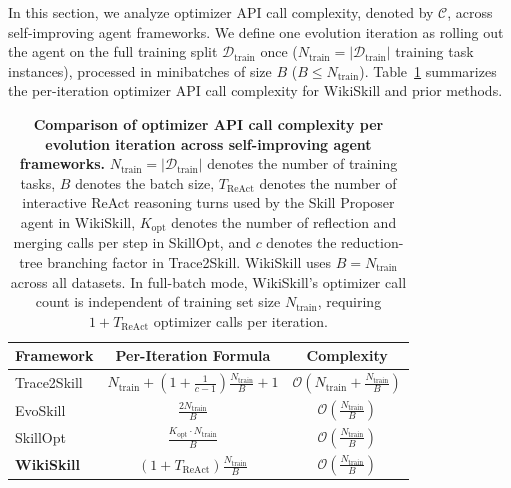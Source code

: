 \documentclass[11pt, a4paper, copyright, gr]{google}
\newcommand{\methodcolor}[1]{\cellcolor[HTML]{FDE293}#1}
\newcommand{\method}{WikiSkill\xspace}
\begin{document}
In this section, we analyze optimizer API call complexity, denoted by $\mathcal{C}$, across self-improving agent frameworks. We define one evolution iteration as rolling out the agent on the full training split $\mathcal{D}_{\text{train}}$ once ($N_{\text{train}} = |\mathcal{D}_{\text{train}}|$ training task instances), processed in minibatches of size $B$ ($B \le N_{\text{train}}$). Table~\ref{tab:api_complexity_summary} summarizes the per-iteration optimizer API call complexity for WikiSkill and prior methods.
\begin{table}[h]
\centering
\small
\begin{tabular}{l c c}
\toprule
\textbf{Framework} & \textbf{Per-Iteration Formula} & \textbf{Complexity} \\
\midrule
Trace2Skill & $N_{\text{train}} + \left(1 + \frac{1}{c-1}\right) \frac{N_{\text{train}}}{B} + 1$ & $\mathcal{O}\left(N_{\text{train}} + \frac{N_{\text{train}}}{B}\right)$ \\
EvoSkill & $\frac{2 N_{\text{train}}}{B}$ & $\mathcal{O}\left(\frac{N_{\text{train}}}{B}\right)$ \\
SkillOpt & $\frac{K_{\text{opt}} \cdot N_{\text{train}}}{B}$ & $\mathcal{O}\left(\frac{N_{\text{train}}}{B}\right)$ \\
\methodcolor{\textbf{WikiSkill}} & \methodcolor{$(1 + T_{\text{ReAct}}) \frac{N_{\text{train}}}{B}$} & \methodcolor{$\mathcal{O}\left(\frac{N_{\text{train}}}{B}\right)$} \\
\bottomrule
\end{tabular}
\caption{\textbf{Comparison of optimizer API call complexity per evolution iteration across self-improving agent frameworks.} $N_{\text{train}} = |\mathcal{D}_{\text{train}}|$ denotes the number of training tasks, $B$ denotes the batch size, $T_{\text{ReAct}}$ denotes the number of interactive ReAct reasoning turns used by the Skill Proposer agent in WikiSkill, $K_{\text{opt}}$ denotes the number of reflection and merging calls per step in SkillOpt, and $c$ denotes the reduction-tree branching factor in Trace2Skill. \method uses $B = N_{\text{train}}$ across all datasets.
In full-batch mode, \method's optimizer call count is independent of training set size $N_{\text{train}}$, requiring $1 + T_{\text{ReAct}}$ optimizer calls per iteration.}

\label{tab:api_complexity_summary}
\end{table}
\end{document}
